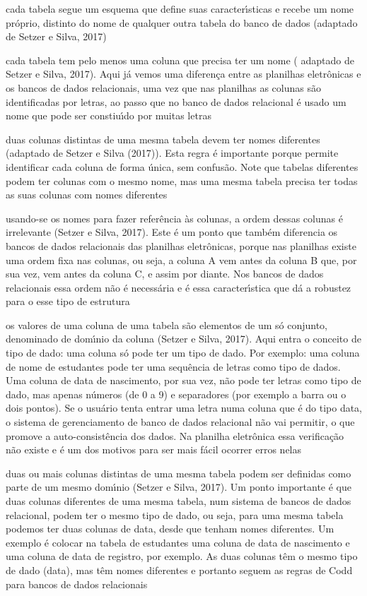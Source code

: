 \documentclass[
12pt,		%
openright,	%
twoside,  %
a4paper,			%
chapter=TITLE,		%
english,			%
french,				%
spanish,			%
brazil				%
]{USPSC-classe/USPSC}
\begin{document}
\begin{alineas}
\item cada tabela segue um esquema que define suas caracter\'{\i}sticas e recebe um nome pr\'oprio, distinto do nome de qualquer outra tabela do banco de dados (adaptado de Setzer e Silva, 2017)
\item cada tabela tem pelo menos uma coluna que precisa ter um nome ( adaptado de Setzer e Silva, 2017). Aqui j\'a vemos uma diferen\c{c}a entre as planilhas eletr\^onicas e os bancos de dados relacionais, uma vez que nas planilhas as colunas s\~ao identificadas por letras, ao passo que no banco de dados relacional \'e usado um nome que pode ser constiu\'{\i}do por muitas letras
\item duas colunas distintas de uma mesma tabela devem ter nomes diferentes (adaptado de Setzer e Silva (2017)). Esta regra \'e importante porque permite identificar cada coluna de forma \'unica, sem confus\~ao. Note que tabelas diferentes podem ter colunas com o mesmo nome, mas uma mesma tabela precisa ter todas as suas colunas com nomes diferentes
\item usando-se os nomes para fazer refer\^encia \`as colunas, a ordem dessas colunas \'e irrelevante  (Setzer e Silva, 2017). Este \'e um ponto que tamb\'em diferencia os bancos de dados relacionais das planilhas eletr\^onicas, porque nas planilhas existe uma ordem fixa nas colunas, ou seja, a coluna A vem antes da coluna B que, por sua vez, vem antes da coluna C, e assim por diante. Nos bancos de dados relacionais essa ordem n\~ao \'e necess\'aria e \'e essa caracter\'{\i}stica que d\'a a robustez para o esse tipo de estrutura
\item os valores de uma coluna de uma tabela s\~ao elementos de um s\'o conjunto, denominado de dom\'{\i}nio da coluna  (Setzer e Silva, 2017). Aqui entra o conceito de tipo de dado: uma coluna s\'o pode ter um tipo de dado. Por exemplo: uma coluna de nome de estudantes pode ter uma sequ\^encia de letras como tipo de dados. Uma coluna de data de nascimento, por sua vez, n\~ao pode ter letras como tipo de dado, mas apenas n\'umeros (de 0 a 9) e separadores (por exemplo a barra ou o dois pontos). Se o usu\'ario tenta entrar uma letra numa coluna que \'e do tipo data, o sistema de gerenciamento de banco de dados relacional n\~ao vai permitir, o que promove a auto-consist\^encia dos dados. Na planilha eletr\^onica essa verifica\c{c}\~ao n\~ao existe e \'e um dos motivos para ser mais f\'acil ocorrer erros nelas
\item duas ou mais colunas distintas de uma mesma tabela podem ser definidas como parte de um mesmo dom\'{\i}nio  (Setzer e Silva, 2017). Um ponto importante \'e que duas colunas diferentes de uma mesma tabela, num sistema de bancos de dados relacional, podem ter o mesmo tipo de dado, ou seja, para uma mesma tabela podemos ter duas colunas de data, desde que tenham nomes diferentes. Um exemplo \'e colocar na tabela de estudantes uma coluna de data de nascimento e uma coluna de data de registro, por exemplo. As duas colunas t\^em o mesmo tipo de dado (data), mas t\^em nomes diferentes e portanto seguem as regras de Codd para bancos de dados relacionais

\end{alineas}
\end{document}
